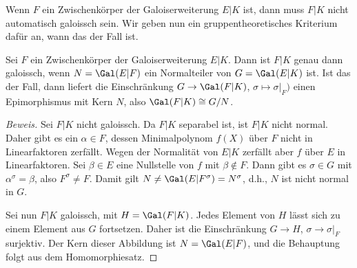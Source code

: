 \documentclass[12pt,a4paper,twoside]{article}
\begin{document}
Wenn $F$ ein Zwischenk\"orper der Galoiserweiterung $E|K$ ist, dann muss $F|K$
nicht automatisch galoissch sein. Wir geben nun ein gruppentheoretisches
Kriterium daf\"ur an, wann das der Fall ist.
\begin{Lemma}
  Sei $F$ ein Zwischenk\"orper der Galoiserweiterung $E|K$. Dann ist $F|K$
  genau dann galoissch, wenn $N=\Gal(E|F)$ ein Normalteiler von $G=\Gal(E|K)$
  ist. Ist das der Fall, dann liefert die Einschr\"ankung $G\to\Gal(F|K)$,
  $\sigma\mapsto \sigma|_F)$ einen Epimorphismus mit Kern $N$, also
  $\Gal(F|K)\cong G/N$.
\end{Lemma}

\begin{proof}[Beweis]
  Sei $F|K$ nicht galoissch. Da $F|K$ separabel ist, ist $F|K$ nicht normal.
  Daher gibt es ein $\alpha\in F$, dessen Minimalpolynom $f(X)$ \"uber $F$
  nicht in Linearfaktoren zerf\"allt. Wegen der Normalit\"at von $E|K$
  zerf\"allt aber $f$ \"uber $E$ in Linearfaktoren. Sei $\beta\in E$ eine
  Nullstelle von $f$ mit $\beta\notin F$. Dann gibt es $\sigma\in G$ mit
  $\alpha^\sigma=\beta$, also $F^\sigma\ne F$. Damit gilt
  $N\ne\Gal(E|F^\sigma)=N^\sigma$, d.h., $N$ ist nicht normal in $G$.
  
  Sei nun $F|K$ galoissch, mit $H=\Gal(F|K)$. Jedes Element von $H$ l\"asst
  sich zu einem Element aus $G$ fortsetzen. Daher ist die Einschr\"ankung
  $G\to H$, $\sigma\to\sigma|_F$ surjektiv. Der Kern dieser Abbildung ist
  $N=\Gal(E|F)$, und die Behauptung folgt aus dem Homomorphiesatz.
\end{proof}
\end{document}
